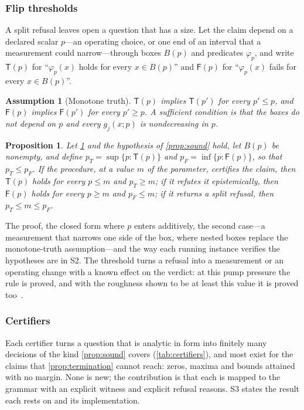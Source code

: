 \documentclass[preprint,11pt,a4paper]{elsarticle}
\newtheorem{proposition}{Proposition}
\newtheorem{assumption}{Assumption}
\theoremstyle{definition}
\newcommand{\Tp}{\mathsf{T}}
\newcommand{\Fp}{\mathsf{F}}
\newcommand{\supp}[1]{S#1}
\begin{document}
\subsubsection{Flip thresholds}\label{sec:thresholds}
A split refusal leaves open a question that has a size. Let the claim depend on a declared scalar $p$---an operating choice, or one end of an interval that a measurement could narrow---through boxes $B(p)$ and predicates $\varphi_p$, and write $\Tp(p)$ for ``$\varphi_p(x)$ holds for every $x\in B(p)$'' and $\Fp(p)$ for ``$\varphi_p(x)$ fails for every $x\in B(p)$''.

\begin{assumption}[Monotone truth]\label{ass:mono}
$\Tp(p)$ implies $\Tp(p')$ for every $p'\le p$, and $\Fp(p)$ implies $\Fp(p')$ for every $p'\ge p$. A sufficient condition is that the boxes do not depend on $p$ and every $g_j(x;p)$ is nondecreasing in $p$.
\end{assumption}

\begin{proposition}\label{prop:thresholds}
Let \cref{ass:mono} and the hypothesis of \cref{prop:sound} hold, let $B(p)$ be nonempty, and define $p_T=\sup\{p:\Tp(p)\}$ and $p_F=\inf\{p:\Fp(p)\}$, so that $p_T\le p_F$. If the procedure, at a value $m$ of the parameter, certifies the claim, then $\Tp(p)$ holds for every $p\le m$ and $p_T\ge m$; if it refutes it epistemically, then $\Fp(p)$ holds for every $p\ge m$ and $p_F\le m$; if it returns a split refusal, then $p_T\le m\le p_F$.
\end{proposition}
The proof, the closed form where $p$ enters additively, the second case---a measurement that narrows one side of the box, where nested boxes replace the monotone-truth assumption---and the way each running instance verifies the hypotheses are in \supp{2}. The threshold turns a refusal into a measurement or an operating change with a known effect on the verdict: at this pump pressure the rule is proved, and with the roughness shown to be at least this value it is proved too~\citep{P2}.

\subsubsection{Certifiers}\label{sec:certifiers}

Each certifier turns a question that is analytic in form into finitely many decisions of the kind \cref{prop:sound} covers (\cref{tab:certifiers}), and most exist for the claims that \cref{prop:termination} cannot reach: zeros, maxima and bounds attained with no margin. None is new; the contribution is that each is mapped to the grammar with an explicit witness and explicit refusal reasons. \supp{3} states the result each rests on and its implementation.
\end{document}
